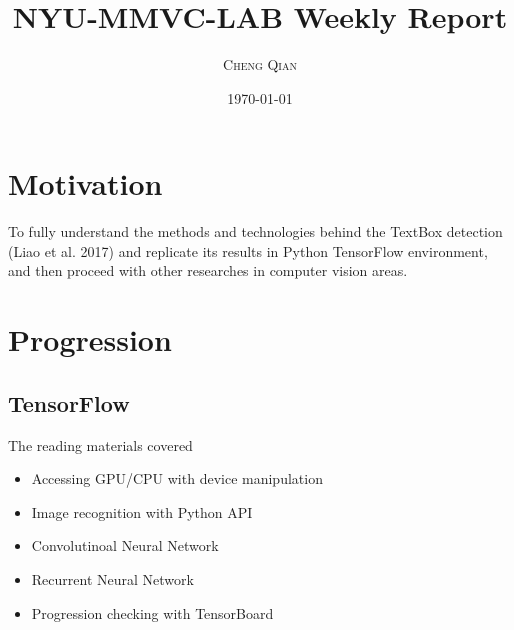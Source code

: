 \documentclass{article}
\title{NYU-MMVC-LAB Weekly Report} %
\author{\textsc{Cheng Qian}} %
\date{\today} %
\begin{document}
\maketitle %




\section{Motivation}

To fully understand the methods and technologies behind the TextBox detection (Liao et al. 2017) and replicate its results in Python TensorFlow environment, and then proceed with other researches in computer vision areas.




\section{Progression}

\subsection{TensorFlow}
The reading materials covered
\begin{itemize}
	\item Accessing GPU/CPU with device manipulation
	\item Image recognition with Python API
	\item Convolutinoal Neural Network
	\item Recurrent Neural Network
	\item Progression checking with TensorBoard
\end{itemize}
\end{document}

